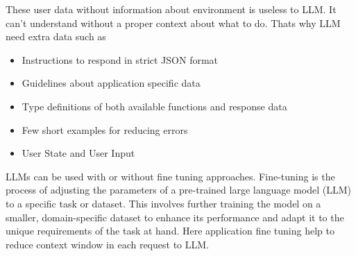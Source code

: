 \noindent These user data without information about environment is useless to LLM. It can't understand without a proper context about what to do. Thats why LLM need extra data such as

\begin{itemize} 
    \item Instructions to respond in strict JSON format
    \item Guidelines about application specific data
    \item Type definitions of both available functions and response data 
    \item Few short examples for reducing errors
    \item User State and User Input
\end{itemize}

\noindent LLMs can be used with or without fine tuning approaches. Fine-tuning is the process of adjusting the parameters of a pre-trained large language model (LLM) to a specific task or dataset. This involves further training the model on a smaller, domain-specific dataset to enhance its performance and adapt it to the unique requirements of the task at hand. Here application fine tuning help to reduce context window in each request to LLM. 


